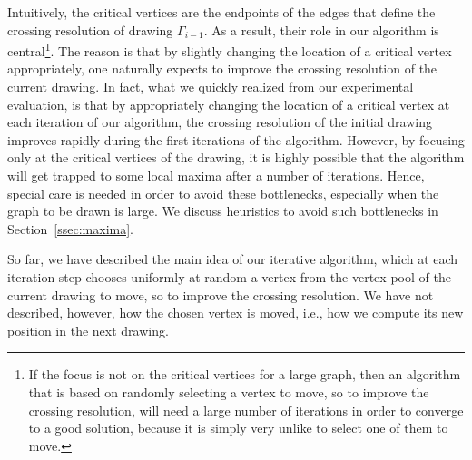 \documentclass[runningheads]{llncs}
\begin{document}
Intuitively, the critical vertices are the endpoints of the edges that define the crossing resolution of drawing $\Gamma_{i-1}$. As a result, their role in our algorithm is central\footnote{If the focus is not on the critical vertices for a large graph, then an algorithm that is based on randomly selecting a vertex to move, so to improve the crossing resolution, will need a large number of iterations in order to converge to a good solution, because it is simply very unlike to select one of them to move.}. The reason is that by slightly changing the location of a critical vertex appropriately, one naturally expects to improve the crossing resolution of the current drawing. In fact, what we quickly realized from our experimental evaluation, is that by appropriately changing the location of a critical vertex at each iteration of our algorithm, the crossing resolution of the initial drawing improves rapidly during the first iterations of the algorithm. However, by focusing only at the critical vertices of the drawing, it is highly possible that the algorithm will get trapped to some local maxima after a number of iterations. Hence, special care is needed in order to avoid these bottlenecks, especially when the graph to be drawn is large. We discuss heuristics to avoid such bottlenecks in  Section~\ref{ssec:maxima}.

So far, we have described the main idea of our iterative algorithm, which at each iteration step chooses uniformly at random a vertex from the vertex-pool of the current drawing to move, so to improve the crossing resolution. We have not described, however, how the chosen vertex is moved, i.e., how we compute its new position in the next drawing.  
\end{document}
